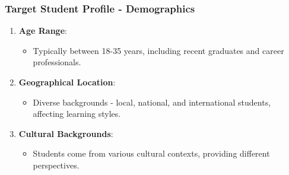 \documentclass[aspectratio=169]{beamer}
\begin{document}
\begin{frame}[fragile]
    \frametitle{Target Student Profile - Demographics}
    \begin{enumerate}
        \item \textbf{Age Range}:
            \begin{itemize}
                \item Typically between 18-35 years, including recent graduates and career professionals.
            \end{itemize}
        \item \textbf{Geographical Location}:
            \begin{itemize}
                \item Diverse backgrounds - local, national, and international students, affecting learning styles.
            \end{itemize}
        \item \textbf{Cultural Backgrounds}:
            \begin{itemize}
                \item Students come from various cultural contexts, providing different perspectives.
            \end{itemize}
    \end{enumerate}
\end{frame}
\end{document}
